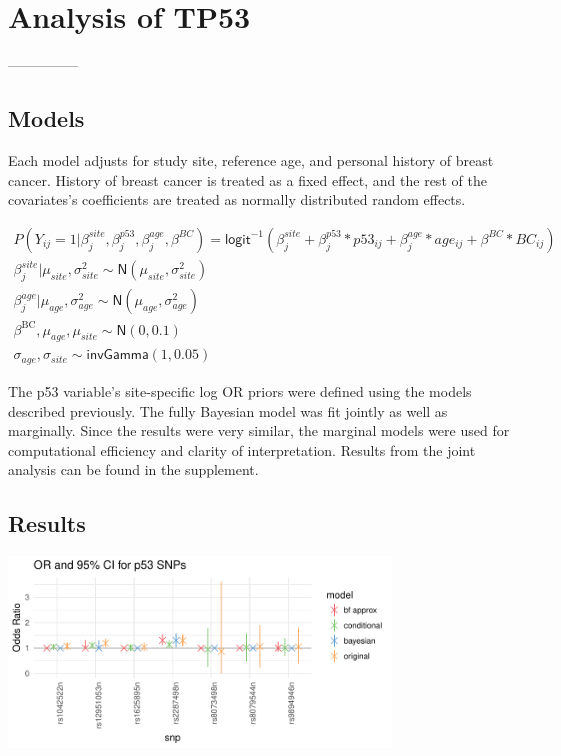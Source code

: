 \documentclass[AMA,STIX1COL]{WileyNJD-v2}\usepackage[]{graphicx}\usepackage[]{color}
\newenvironment{knitrout}{}{} %
\begin{document}
\section{Analysis of TP53}\label{sec:tp53}
---------------
\subsection{Models}


Each model adjusts for study site, reference age, and personal history of breast cancer. History of breast cancer is treated as a fixed effect, and the rest of the covariates's coefficients are treated as normally distributed random effects. 

\begin{gather}
P(Y_{ij}=1| \beta^{site}_{ j}, \beta^{p53}_{j}, \beta^{age}_{j},\beta^{BC}) = \textsf{logit}^{-1}(\beta^{site}_{ j}+ \beta^{p53}_{j}*p53_{ij}+ \beta^{age}_{j}*age_{ij}+\beta^{BC}* BC_{ij})\\
\beta^{site}_{ j}|\mu_{site}, \sigma_{site}^{2}\sim \textsf{N}(\mu_{site}, \sigma_{site}^{2})\\
\beta^{age}_{j}|\mu_{age}, \sigma^{2}_{age}\sim \textsf{N}(\mu_{age}, \sigma^{2}_{age})\\
\beta^{\text{BC}}, \mu_{age},\mu_{site}\sim \textsf{N}(0,0.1)\\
\sigma_{age},\sigma_{site} \sim \textsf{invGamma}(1, 0.05)
\end{gather}

The p53 variable's site-specific log OR priors were defined using the models described previously. The fully Bayesian model was fit jointly as well as marginally. Since the results were very similar, the marginal models were used for computational efficiency and clarity of interpretation. Results from the joint analysis can be found in the supplement.

\subsection{Results}







\begin{knitrout}
\color{fgcolor}

{\centering \includegraphics[width=4in]{figure/unnamed-chunk-32-1} 

}



\end{knitrout}
\end{document}
